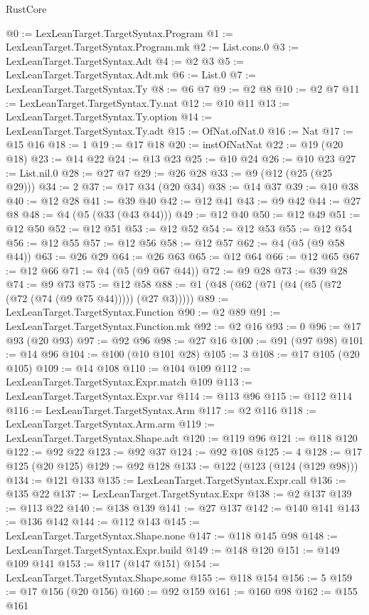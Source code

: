 \begin{lexlean}{RustCore}
\begin{coremodule}
@0 := LexLeanTarget.TargetSyntax.Program
@1 := LexLeanTarget.TargetSyntax.Program.mk
@2 := List.cons.{0}
@3 := LexLeanTarget.TargetSyntax.Adt
@4 := @2 @3
@5 := LexLeanTarget.TargetSyntax.Adt.mk
@6 := List.{0}
@7 := LexLeanTarget.TargetSyntax.Ty
@8 := @6 @7
@9 := @2 @8
@10 := @2 @7
@11 := LexLeanTarget.TargetSyntax.Ty.nat
@12 := @10 @11
@13 := LexLeanTarget.TargetSyntax.Ty.option
@14 := LexLeanTarget.TargetSyntax.Ty.adt
@15 := OfNat.ofNat.{0}
@16 := Nat
@17 := @15 @16
@18 := 1
@19 := @17 @18
@20 := instOfNatNat
@22 := @19 (@20 @18)
@23 := @14 @22
@24 := @13 @23
@25 := @10 @24
@26 := @10 @23
@27 := List.nil.{0}
@28 := @27 @7
@29 := @26 @28
@33 := @9 (@12 (@25 (@25 @29)))
@34 := 2
@37 := @17 @34 (@20 @34)
@38 := @14 @37
@39 := @10 @38
@40 := @12 @28
@41 := @39 @40
@42 := @12 @41
@43 := @9 @42
@44 := @27 @8
@48 := @4 (@5 (@33 (@43 @44)))
@49 := @12 @40
@50 := @12 @49
@51 := @12 @50
@52 := @12 @51
@53 := @12 @52
@54 := @12 @53
@55 := @12 @54
@56 := @12 @55
@57 := @12 @56
@58 := @12 @57
@62 := @4 (@5 (@9 @58 @44))
@63 := @26 @29
@64 := @26 @63
@65 := @12 @64
@66 := @12 @65
@67 := @12 @66
@71 := @4 (@5 (@9 @67 @44))
@72 := @9 @28
@73 := @39 @28
@74 := @9 @73
@75 := @12 @58
@88 := @1 (@48 (@62 (@71 (@4 (@5 (@72 (@72 (@74 (@9 @75 @44))))) (@27 @3)))))
@89 := LexLeanTarget.TargetSyntax.Function
@90 := @2 @89
@91 := LexLeanTarget.TargetSyntax.Function.mk
@92 := @2 @16
@93 := 0
@96 := @17 @93 (@20 @93)
@97 := @92 @96
@98 := @27 @16
@100 := @91 (@97 @98)
@101 := @14 @96
@104 := @100 (@10 @101 @28)
@105 := 3
@108 := @17 @105 (@20 @105)
@109 := @14 @108
@110 := @104 @109
@112 := LexLeanTarget.TargetSyntax.Expr.match @109
@113 := LexLeanTarget.TargetSyntax.Expr.var
@114 := @113 @96
@115 := @112 @114
@116 := LexLeanTarget.TargetSyntax.Arm
@117 := @2 @116
@118 := LexLeanTarget.TargetSyntax.Arm.arm
@119 := LexLeanTarget.TargetSyntax.Shape.adt
@120 := @119 @96
@121 := @118 @120
@122 := @92 @22
@123 := @92 @37
@124 := @92 @108
@125 := 4
@128 := @17 @125 (@20 @125)
@129 := @92 @128
@133 := @122 (@123 (@124 (@129 @98)))
@134 := @121 @133
@135 := LexLeanTarget.TargetSyntax.Expr.call
@136 := @135 @22
@137 := LexLeanTarget.TargetSyntax.Expr
@138 := @2 @137
@139 := @113 @22
@140 := @138 @139
@141 := @27 @137
@142 := @140 @141
@143 := @136 @142
@144 := @112 @143
@145 := LexLeanTarget.TargetSyntax.Shape.none
@147 := @118 @145 @98
@148 := LexLeanTarget.TargetSyntax.Expr.build
@149 := @148 @120
@151 := @149 @109 @141
@153 := @117 (@147 @151)
@154 := LexLeanTarget.TargetSyntax.Shape.some
@155 := @118 @154
@156 := 5
@159 := @17 @156 (@20 @156)
@160 := @92 @159
@161 := @160 @98
@162 := @155 @161

\end{coremodule}
\end{lexlean}
